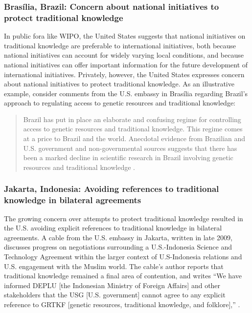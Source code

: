 \documentclass[12pt]{article}
\begin{document}
\subsubsection{Bras\'ilia, Brazil: Concern about national initiatives to protect traditional knowledge}
In public fora like WIPO, the United States suggests that national initiatives on traditional knowledge 
are preferable to international initiatives, both because national initiatives can account for 
widely varying local conditions, and because national initiatives can offer important information for 
the future development of international initiatives. Privately, however, the United States expresses 
concern about national initiatives to protect traditional knowledge. As an illustrative example, 
consider comments from the U.S. embassy in Bras\'ilia regarding Brazil's approach to regulating access 
to genetic resources and traditional knowledge:
\begin{quote}
Brazil has put in place an elaborate and confusing regime for 
controlling access to genetic resources and traditional knowledge. 
This regime comes at a price to Brazil and the world.  Anecdotal 
evidence from Brazilian and U.S. government and non-governmental 
sources suggests that there has been a marked decline in scientific 
research in Brazil involving genetic resources and traditional 
knowledge \citep{u.s._department_of_state2009brazils}.
\end{quote}

\subsubsection{Jakarta, Indonesia: Avoiding references to traditional knowledge in bilateral agreements}
The growing concern over attempts to protect traditional knowledge resulted 
in the U.S. avoiding explicit references to traditional 
knowledge in 
bilateral agreements.
A cable from the U.S. embassy in Jakarta, written in 
late 2009, discusses progress on negotiations surrounding a U.S.-Indonesia Science and Technology 
Agreement within the larger context of U.S-Indonesia relations and U.S. engagement with the Muslim 
world. The cable's author reports that traditional knowledge remained a final area of contention, and 
writes ``We have informed DEPLU [the Indonesian Ministry of Foreign Affairs] and other
stakeholders that the USG [U.S. government] cannot agree to any explicit reference to
GRTKF [genetic resources, traditional knowledge, and 
folklore],'' \citep{u.s._department_of_state2009indonesia}.
\end{document}
